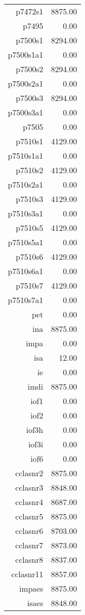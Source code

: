 \begin{table}[ht]
\begin{tabular}{rr}
  p7472s1 & 8875.00 \\ 
  p7495 & 0.00 \\ 
  p7500s1 & 8294.00 \\ 
  p7500s1a1 & 0.00 \\ 
  p7500s2 & 8294.00 \\ 
  p7500s2a1 & 0.00 \\ 
  p7500s3 & 8294.00 \\ 
  p7500s3a1 & 0.00 \\ 
  p7505 & 0.00 \\ 
  p7510s1 & 4129.00 \\ 
  p7510s1a1 & 0.00 \\ 
  p7510s2 & 4129.00 \\ 
  p7510s2a1 & 0.00 \\ 
  p7510s3 & 4129.00 \\ 
  p7510s3a1 & 0.00 \\ 
  p7510s5 & 4129.00 \\ 
  p7510s5a1 & 0.00 \\ 
  p7510s6 & 4129.00 \\ 
  p7510s6a1 & 0.00 \\ 
  p7510s7 & 4129.00 \\ 
  p7510s7a1 & 0.00 \\ 
  pet & 0.00 \\ 
  ina & 8875.00 \\ 
  impa & 0.00 \\ 
  isa & 12.00 \\ 
  ie & 0.00 \\ 
  imdi & 8875.00 \\ 
  iof1 & 0.00 \\ 
  iof2 & 0.00 \\ 
  iof3h & 0.00 \\ 
  iof3i & 0.00 \\ 
  iof6 & 0.00 \\ 
  cclasnr2 & 8875.00 \\ 
  cclasnr3 & 8848.00 \\ 
  cclasnr4 & 8687.00 \\ 
  cclasnr5 & 8875.00 \\ 
  cclasnr6 & 8703.00 \\ 
  cclasnr7 & 8873.00 \\ 
  cclasnr8 & 8837.00 \\ 
  cclasnr11 & 8857.00 \\ 
  impaes & 8875.00 \\ 
  isaes & 8848.00 \\ 

\end{tabular}
\end{table}
